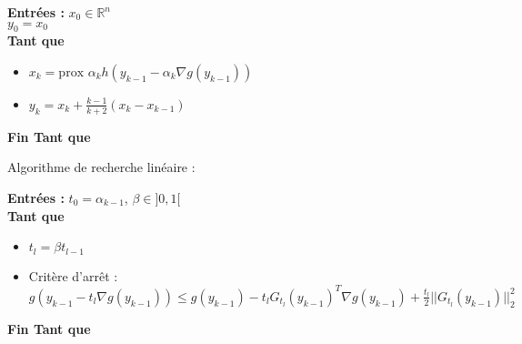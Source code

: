 \documentclass[12pt,a4paper]{article}
\begin{document}
\begin{algorithm}
    \SetAlgoLined
    \textbf{Entrées :} $x_0 \in \mathbb{R}^n$\\
    $y_0 = x_0$\\
    \textbf{Tant que}\\
    \begin{itemize}
        \item $x_k = \text{prox } \alpha_k h (y_{k-1} - \alpha_k \nabla g(y_{k-1}))$
        \item $y_k = x_k + \frac{k-1}{k+2} (x_k - x_{k-1})$
    \end{itemize}
    \textbf{Fin Tant que}\\
\end{algorithm}

Algorithme de recherche linéaire :\\

\begin{algorithm}
    \SetAlgoLined
    \textbf{Entrées :} $t_0 = \alpha_{k-1}$, $\beta \in ]0, 1[ $\\
    \textbf{Tant que}\\
    \begin{itemize}
        \item $t_l = \beta t_{l-1}$
        \item Critère d'arrêt : $g(y_{k-1} - t_l \nabla g(y_{k-1})) \leq g(y_{k-1}) - t_l G_{t_l}(y_{k-1})^T \nabla g(y_{k-1}) + \frac{t_l}{2} ||G_{t_l}(y_{k-1})||_2^2$\\
    \end{itemize}
    \textbf{Fin Tant que}\\
\end{algorithm}
\end{document}

